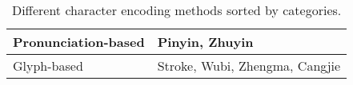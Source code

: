 \begin{table}[t]
\begin{center}
\small
\begin{tabular}{ lp{3cm} } 
 \toprule
  Pronunciation-based & Pinyin, Zhuyin \\ 
  \hline
 Glyph-based &  Stroke, Wubi, \newline 
 Zhengma, Cangjie \\ 
 \bottomrule
\end{tabular}
 \caption{Different character encoding methods sorted by categories. 
 }
 \label{tab:all_encodings}
\end{center}
\end{table}